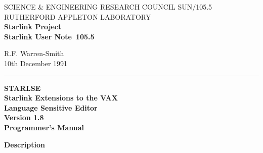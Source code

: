 \pagestyle{myheadings}

\newcommand{\stardoccategory}  {Starlink User Note}
\newcommand{\stardocinitials}  {SUN}
\newcommand{\stardocnumber}    {105.5}
\newcommand{\stardocauthors}   {R.F. Warren-Smith}
\newcommand{\stardocdate}      {10th December 1991}
\newcommand{\stardoctitle}     {STARLSE \\ [1ex]
                                Starlink Extensions to the VAX \\
                                Language Sensitive Editor}
\newcommand{\stardocversion}   {Version 1.8}
\newcommand{\stardocmanual}    {Programmer's Manual}

\newcommand{\stardocname}{\stardocinitials /\stardocnumber}
\markright{\stardocname}
\setlength{\textwidth}{160mm}
\setlength{\textheight}{230mm}
\setlength{\topmargin}{-2mm}
\setlength{\oddsidemargin}{0mm}
\setlength{\evensidemargin}{0mm}
\setlength{\parindent}{0mm}
\setlength{\parskip}{\medskipamount}
\setlength{\unitlength}{1mm}

\renewcommand{\_}{{\tt\char'137}}
\renewcommand{\thepage}{\roman{page}}



\thispagestyle{empty}
SCIENCE \& ENGINEERING RESEARCH COUNCIL \hfill \stardocname\\
RUTHERFORD APPLETON LABORATORY\\
{\large\bf Starlink Project\\}
{\large\bf \stardoccategory\ \stardocnumber}
\begin{flushright}
\stardocauthors\\
\stardocdate
\end{flushright}
\vspace{-4mm}
\rule{\textwidth}{0.5mm}
\vspace{5mm}
\begin{center}
{\Huge\bf  \stardoctitle \\ [2.5ex]}
{\LARGE\bf \stardocversion \\ [4ex]}
{\Huge\bf  \stardocmanual}
\end{center}
\vspace{20mm}

\begin{center}
{\Large\bf Description}
\end{center}

